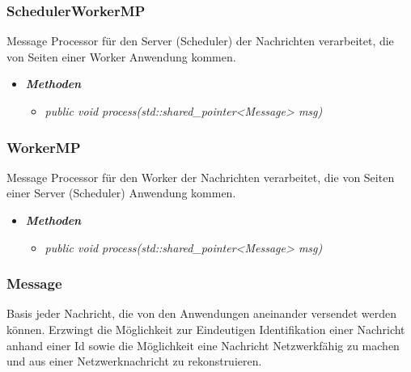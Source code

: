 \documentclass[a4paper,12pt]{article}
\begin{document}
\subsubsection{SchedulerWorkerMP}

Message Processor für den Server (Scheduler) der Nachrichten verarbeitet, die von Seiten einer Worker Anwendung kommen.

	\begin{itemize}[label={}]

	\item\textit{\textbf{Methoden}}
		\begin{itemize}[label={\textbullet}]
			\item\textit{public void process(std::shared\_pointer<Message> msg)}

		\end{itemize}

\end{itemize}


\subsubsection{WorkerMP}

Message Processor für den Worker der Nachrichten verarbeitet, die von Seiten einer Server (Scheduler) Anwendung kommen.

	\begin{itemize}[label={}]

	\item\textit{\textbf{Methoden}}
		\begin{itemize}[label={\textbullet}]
			\item\textit{public void process(std::shared\_pointer<Message> msg)}

		\end{itemize}

\end{itemize}


\subsubsection{Message}

Basis jeder Nachricht, die von den Anwendungen aneinander versendet werden können. Erzwingt die Möglichkeit zur Eindeutigen Identifikation einer Nachricht anhand einer Id sowie die Möglichkeit eine Nachricht Netzwerkfähig zu machen und aus einer Netzwerknachricht zu rekonstruieren.
\end{document}
